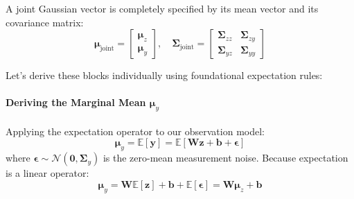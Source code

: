 \documentclass{article}
\begin{document}
A joint Gaussian vector is completely specified by its mean vector and its covariance matrix:
\begin{equation*}
\boldsymbol{\mu}_{\text{joint}} = \begin{bmatrix} \boldsymbol{\mu}_z \\ \boldsymbol{\mu}_y \end{bmatrix}, \quad \boldsymbol{\Sigma}_{\text{joint}} = \begin{bmatrix} \boldsymbol{\Sigma}_{zz} & \boldsymbol{\Sigma}_{zy} \\ \boldsymbol{\Sigma}_{yz} & \boldsymbol{\Sigma}_{yy} \end{bmatrix}
\end{equation*}

Let's derive these blocks individually using foundational expectation rules:

\paragraph{Deriving the Marginal Mean $\boldsymbol{\mu}_y$}
Applying the expectation operator to our observation model:
\begin{equation*}
\boldsymbol{\mu}_y = \mathbb{E}[\mathbf{y}] = \mathbb{E}[\mathbf{W}\mathbf{z} + \mathbf{b} + \boldsymbol{\epsilon}]
\end{equation*}
where $\boldsymbol{\epsilon} \sim \mathcal{N}(\mathbf{0}, \boldsymbol{\Sigma}_y)$ is the zero-mean measurement noise. Because expectation is a linear operator:
\begin{equation}
\boldsymbol{\mu}_y = \mathbf{W}\mathbb{E}[\mathbf{z}] + \mathbf{b} + \mathbb{E}[\boldsymbol{\epsilon}] = \mathbf{W}\boldsymbol{\mu}_z + \mathbf{b} \tag{28}
\end{equation}
\end{document}
